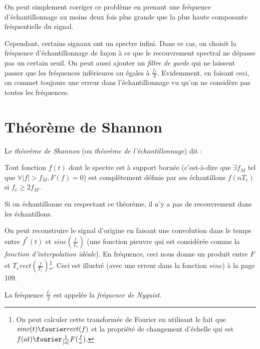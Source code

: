         On peut simplement corriger ce problème en prenant une fréquence d'échantillonnage au moins deux fois plus grande que la plus haute composante fréquentielle du signal.
        
        Cependant, certains signaux ont un spectre infini. Dans ce cas, on choisit la fréquence d'échantillonnage de façon à ce que le recouvrement spectral ne dépasse pas un certain seuil. On peut aussi ajouter un \textit{filtre de garde} qui ne laissent passer que les fréquences inférieures ou égales à $\frac{f_e}{2}$. Evidemment, en faisant ceci, on commet toujours une erreur dans l'échantillonnage vu qu'on ne considère pas toutes les fréquences.

    \section{Théorème de Shannon}
        Le \textit{théorème de Shannon} (ou \textit{théorème de l'échantillonnage}) dit :
        \begin{theorem}
            Tout fonction $f(t)$ dont le spectre est à support bornée (c'est-à-dire que $\exists f_M$ tel que $\forall |f| > f_M, F(f) = 0$) est complètement définie par ses échantillons $f(n T_e)$ si $f_e \geq 2f_M$.
        \end{theorem}

        Si on échantillonne en respectant ce théorème, il n'y a pas de recouvrement dans les échantillons.

        On peut reconstruire le signal d'origine en faisant une convolution dans le temps entre $f^*(t)$ et $sinc(\frac{t}{T_e})$ (une fonction pieuvre qui est considérée comme la \textit{fonction d'interpolation idéale}). En fréquence, ceci nous donne un produit entre $F$ et $T_e rect(\frac{f}{T_e})$\footnote{On peut calculer cette transformée de Fourier en utilisant le fait que $sinc(t) \fourier rect(f)$ et la propriété de changement d'échelle qui est $f(at) \fourier \frac{1}{|a|}F(\frac{f}{a})$.}. Ceci est illustré (avec une erreur dans la fonction $sinc$) à la page 109.

        La fréquence $\frac{f_e}{2}$ est appelée la \textit{fréquence de Nyquist}.

